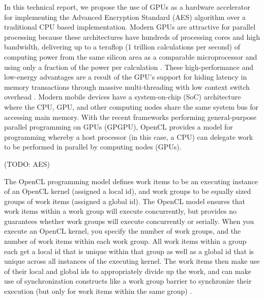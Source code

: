 \documentclass[conference,10pt]{IEEEtran}
\begin{document}
In this technical report, we propose the use of GPUs as a hardware accelerator for implementing the 
Advanced Encryption Standard (AES) algorithm over a traditional CPU based implementation.  Modern 
GPUs are attractive for parallel processing because these architectures have hundreds of processing 
cores and high bandwidth, delivering up to a teraflop (1 trillion calculations per second) of 
computing power from the same silicon area as a comparable microprocessor and using only a fraction 
of the power per calculation \cite{myth}. These high-performance and low-energy advantages are a 
result of the GPU's support for hiding latency in memory transactions through massive 
multi-threading with low context switch overhead \cite{aes_gpu}.  Modern mobile devices have a 
system-on-chip (SoC) architecture where the CPU, GPU, and other computing nodes share the same 
system bus for accessing main memory. With the recent frameworks performing general-purpose parallel 
programming on GPUs (GPGPU), OpenCL provides a model for programming whereby a host processor (in 
this case, a CPU) can delegate work to be performed in parallel by computing nodes (GPUs).

(TODO: AES)

The OpenCL programming model defines work items to be an executing instance of an OpenCL kernel 
(assigned a local id), and work groups to be equally sized groups of work items (assigned a global 
id). The OpenCL model ensures that work items within a work group will execute concurrently, but 
provides no guarantees whether work groups will execute concurrently or serially. When you execute 
an OpenCL kernel, you specify the number of work groups, and the number of work items within each 
work group. All work items within a group each get a local id that is unique within that group as 
well as a global id that is unique across all instances of the executing kernel. The work items then 
make use of their local and global ids to appropriately divide up the work, and can make use of 
synchronization constructs like a work group barrier to synchronize their execution (but only for 
work items within the same group) \cite{opencl_guide}.

%
%
\end{document}
